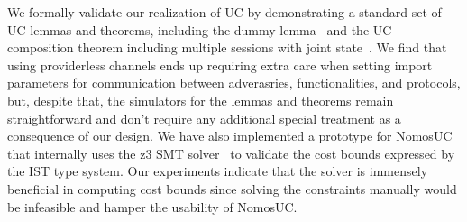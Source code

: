 

We formally validate our realization of UC by demonstrating a standard set of UC lemmas and theorems, including the dummy lemma~\cite{ilc,gnuc,easyuc,canettiUC} and the UC composition theorem including multiple sessions with joint state~\cite{symbolicuc}. 
We find that using providerless channels ends up requiring extra care when setting import parameters for communication between adverasries, functionalities, and protocols, but, despite that, the simulators for the lemmas and theorems remain straightforward and don't require any additional special treatment as a consequence of our design.
We have also implemented a prototype for NomosUC that internally uses the z3 SMT solver~\cite{Moura08Z3} to validate the cost bounds
expressed by the IST type system.
Our experiments indicate that the solver is immensely beneficial in computing cost bounds since solving the constraints manually would be infeasible and hamper the usability of NomosUC.


